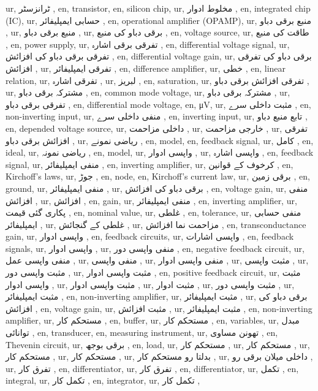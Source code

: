 ur, ٹرانزسٹر ,
en, transistor,
en, silicon chip,
ur, مخلوط ادوار ,
en, integrated chip (IC),
ur, حسابی ایمپلیفائر ,
en, operational amplifier (OPAMP),
ur, منبع برقی دباو ,
ur, منبع برقی دباو ,
ur, برقی دباو کی منبع ,
en, voltage source,
ur, طاقت کی منبع ,
en, power supply,
ur, تفرقی برقی اشارہ ,
en, differential voltage signal,
ur, تفرقی برقی دباو کی افزائش ,
en, differential voltage gain,
ur, برقی دباو کی تفرقی افزائش ,
ur, تفرقی ایمپلیفائر ,
en, difference amplifier,
ur, خطی ,
en, linear relation,
ur, تفرقی اشارہ ,
ur, لبریز ,
en, saturation,
ur, تفرقی افزائش برقی دباو ,
ur, مشترکہ برقی دباو ,
en, common mode voltage,
ur, مشترکہ برقی دباو ,
ur, تفرقی برقی دباو ,
en, differential mode voltage,
en, \si {\micro \volt },
ur, مثبت داخلی سرے ,
en, non-inverting input,
ur, منفی داخلی سرے ,
en, inverting input,
ur, تابع منبع دباو ,
en, depended voltage source,
ur, داخلی مزاحمت ,
ur, خارجی مزاحمت ,
ur, تفرقی افزائش برقی دباو ,
ur, ریاضی نمونے ,
en, model,
en, feedback signal,
ur, کامل ,
en, ideal,
ur, ریاضی نمونہ ,
en, model,
ur, واپسی ادوار ,
ur, واپسی اشارہ ,
en, feedback signal,
ur, منفی ایمپلیفائر ,
en, inverting amplifier,
ur, کرخوف کے قوانین ,
en, Kirchoff's laws,
ur, جوڑ ,
en, node,
en, Kirchoff's current law,
ur, برقی زمین ,
en, ground,
ur, منفی ایمپلیفائر ,
ur, برقی دباو کی افزائش ,
en, voltage gain,
ur, منفی افزائش ,
ur, افزائش ,
en, gain,
ur, منفی ایمپلیفائر ,
en, inverting amplifier,
ur, پکاری گئی قیمت ,
en, nominal value,
ur, غلطی ,
en, tolerance,
ur, منفی حسابی ایمپلیفائر ,
ur, غلطی کے گنجائش ,
ur, مزاحمت نما افزائش ,
en, transconductance gain,
ur, واپسی ادوار ,
en, feedback circuits,
ur, واپسی اشارات ,
en, feedback signals,
ur, واپسی ادوار ,
ur, منفی واپسی دور ,
en, negative feedback circuit,
ur, منفی واپسی عمل ,
ur, منفی واپسی ,
ur, منفی واپسی ادوار ,
ur, مثبت واپسی ,
ur, مثبت واپسی دور ,
ur, مثبت واپسی ادوار ,
en, positive feedback circuit,
ur, مثبت واپسی ادوار ,
ur, مثبت واپسی ادوار ,
ur, مثبت ادوار ,
ur, مثبت واپسی دور ,
ur, مثبت ایمپلیفائر ,
en, non-inverting amplifier,
ur, مثبت ایمپلیفائر ,
ur, برقی دباو کی افزائش ,
en, voltage gain,
ur, مثبت افزائش ,
ur, مثبت ایمپلیفائر ,
en, non-inverting amplifier,
ur, مستحکم کار ,
en, buffer,
ur, مستحکم کار ,
en, variables,
ur, مبدل توانائی ,
en, transducer,
en, measuring instrument,
ur, تھونن مساوی ,
en, Thevenin circuit,
ur, برقی بوجھ ,
en, load,
ur, مستحکم کار ,
ur, مستحکم کار ,
ur, مستحکم کار ,
ur, مستحکم کار ,
ur, بدلتا رو مستحکم کار ,
ur, داخلی میلان برقی رو ,
ur, تفرق کار ,
en, differentiator,
ur, تفرق کار ,
en, differentiator,
ur, تکمل ,
en, integral,
ur, تکمل کار ,
en, integrator,
ur, تکمل کار ,
